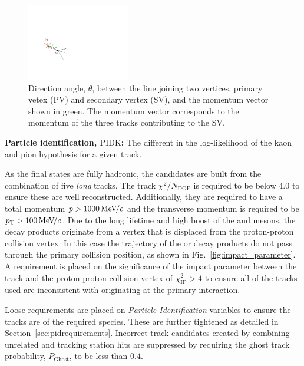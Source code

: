 \begin{description}
\begin{figure}[!h]
    \centering
    \includegraphics[width=0.4\textwidth]{figs/Selection/DIRA.pdf}
    \caption{Direction angle, $\theta$, between the line joining two vertices, primary vetex (PV) and secondary vertex (SV), and the momentum vector shown in green. The momentum vector corresponds to the momentum of the three tracks contributing to the SV. }
    \label{fig:dira}   
\end{figure}


\item \textbf{Particle identification, $\text{PIDK}$:} The different in the log-likelihood of the kaon and pion hypothesis for a given track.  
\end{description}


As the final states are fully hadronic, the candidates are built from the combination of five \emph{long} tracks. 
The track $\chi^{2}/N_{\text{DOF}}$ is required to be below $4.0$ to ensure these are well reconstructed. Additionally, they are required to have a total momentum $\mbox{$p$} > 1000 {\mathrm{\,Me\kern -0.1em V\!/}c}$ and the transverse momentum is required to be $\mbox{$p_{\mathrm{ T}}$} > 100 {\mathrm{\,Me\kern -0.1em V\!/}c}$.
Due to the long lifetime and high boost of the \Bp and \D mesons, the decay products originate from a vertex that is displaced from the proton-proton collision vertex. In this case the trajectory of the \Bp or \D decay products do not pass through the primary collision position, as shown in Fig.~\ref{fig:impact_parameter}. A requirement is placed on the significance of the impact parameter between the track and the proton-proton collision vertex of $\chi^{2}_{\text{IP}} > 4$ to ensure all of the tracks used are inconsistent with originating at the primary interaction.  


Loose requirements are placed on \emph{Particle Identification} variables to ensure the tracks are of the required species. These are further tightened as detailed in Section~\ref{sec:pidrequirements}. Incorrect track candidates created by combining unrelated \velo and tracking station hits are suppressed by requiring the ghost track probability, $P_{\text{Ghost}}$, to be less than $0.4$. 

